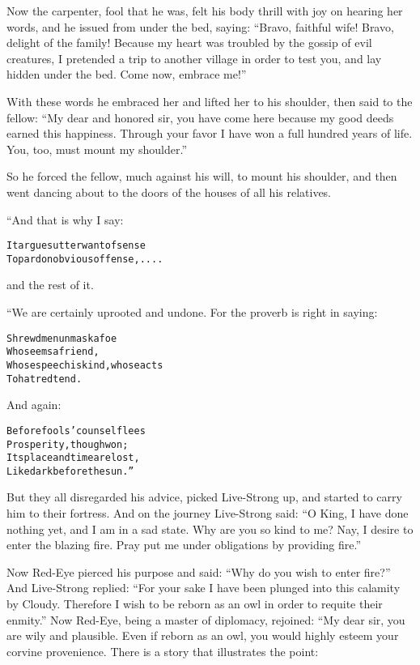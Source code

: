 \documentclass{article}
\renewenvironment{verbatim}{\begin{alltt}\normalfont\begin{centering}}{\end{centering}\end{alltt}}
\begin{document}
Now the carpenter, fool that he was, felt his body thrill with joy
on hearing her words, and he issued from under the bed, saying:
``Bravo, faithful wife! Bravo, delight of the family! Because my heart was troubled by the gossip of evil creatures, I pretended a trip to another village in order to test you, and lay hidden under the bed. Come now, embrace me!''

With these words he embraced her and lifted her to his shoulder,
then said to the fellow:
``My dear and honored sir, you have come here because my good deeds earned this happiness. Through your favor I have won a full hundred years of life. You, too, must mount my shoulder.''

So he forced the fellow, much against his will, to mount his
shoulder, and then went dancing about to the doors of the houses of
all his relatives.

“And that is why I say:

\begin{verbatim}
It argues utter want of sense
To pardon obvious offense, . . . .
\end{verbatim}
and the rest of it.

“We are certainly uprooted and undone. For the proverb is right in
saying:

\begin{verbatim}
Shrewd men unmask a foe
    Who seems a friend,
Whose speech is kind, whose acts
    To hatred tend.
\end{verbatim}
And again:

\begin{verbatim}
Before fools' counsel flees
    Prosperity, though won;
Its place and time are lost,
    Like dark before the sun.”
\end{verbatim}
But they all disregarded his advice, picked Live-Strong up, and
started to carry him to their fortress. And on the journey
Live-Strong said:
``O King, I have done nothing yet, and I am in a sad state. Why are you so kind to me? Nay, I desire to enter the blazing fire. Pray put me under obligations by providing fire.''

Now Red-Eye pierced his purpose and said:
``Why do you wish to enter fire?'' And Live-Strong replied:
``For your sake I have been plunged into this calamity by Cloudy. Therefore I wish to be reborn as an owl in order to requite their enmity.''
Now Red-Eye, being a master of diplomacy, rejoined: “My dear sir,
you are wily and plausible. Even if reborn as an owl, you would
highly esteem your corvine provenience. There is a story that
illustrates the point:
\end{document}
